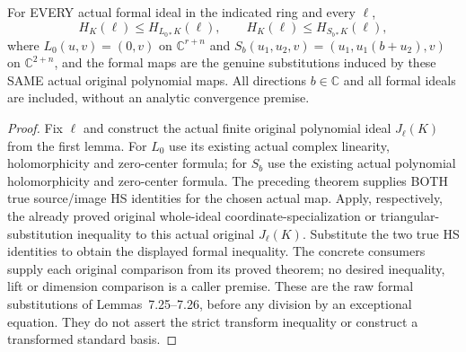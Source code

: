 \begin{theorem}
\label{hir:actual-formal-coordinate-and-triangular-hs-inequalities}
For EVERY actual formal ideal in the indicated ring and every $\ell$,
\[
 H_K(\ell)\le H_{L_{0*}K}(\ell),\qquad
 H_K(\ell)\le H_{S_{b*}K}(\ell),
\]
where $L_0(u,v)=(0,v)$ on $\mathbb C^{r+n}$ and
$S_b(u_1,u_2,v)=(u_1,u_1(b+u_2),v)$ on $\mathbb C^{2+n}$,
and the formal maps are the genuine substitutions induced by these SAME
actual original polynomial maps. All directions $b\in\mathbb C$ and
all formal ideals are included, without an analytic convergence premise.
\leanok
\end{theorem}
\begin{proof}
Fix $\ell$ and construct the actual finite original polynomial ideal
$J_\ell(K)$ from the first lemma. For $L_0$ use its existing actual
complex linearity, holomorphicity and zero-center formula; for $S_b$ use
the existing actual polynomial holomorphicity and zero-center formula.
The preceding theorem supplies BOTH true source/image HS identities
for the chosen actual map. Apply, respectively, the already proved
original whole-ideal coordinate-specialization or triangular-substitution
inequality to this actual original $J_\ell(K)$. Substitute the two true
HS identities to obtain the displayed formal inequality. The concrete
consumers supply each original comparison from its proved theorem;
no desired inequality, lift or dimension comparison is a caller premise.
These are the raw formal substitutions of Lemmas~7.25--7.26, before any
division by an exceptional equation. They do not assert the strict
transform inequality or construct a transformed standard basis.
\end{proof}

